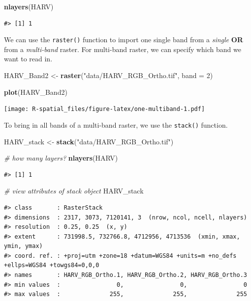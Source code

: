 \documentclass[]{book}
\newenvironment{Shaded}{\begin{snugshade}}{\end{snugshade}}
\newcommand{\KeywordTok}[1]{\textcolor[rgb]{0.13,0.29,0.53}{\textbf{#1}}}
\newcommand{\DataTypeTok}[1]{\textcolor[rgb]{0.13,0.29,0.53}{#1}}
\newcommand{\DecValTok}[1]{\textcolor[rgb]{0.00,0.00,0.81}{#1}}
\newcommand{\StringTok}[1]{\textcolor[rgb]{0.31,0.60,0.02}{#1}}
\newcommand{\CommentTok}[1]{\textcolor[rgb]{0.56,0.35,0.01}{\textit{#1}}}
\newcommand{\NormalTok}[1]{#1}
\theoremstyle{definition}
\theoremstyle{definition}
\theoremstyle{definition}
\theoremstyle{remark}
\begin{document}
\begin{Shaded}
\begin{Highlighting}[]
\KeywordTok{nlayers}\NormalTok{(HARV)}
\end{Highlighting}
\end{Shaded}

\begin{verbatim}
#> [1] 1
\end{verbatim}

We can use the \texttt{raster()} function to import one single band from
a \emph{single} \textbf{OR} from a \emph{multi-band} raster. For
multi-band raster, we can specify which band we want to read in.

\begin{Shaded}
\begin{Highlighting}[]
\NormalTok{HARV_Band2 <-}
\StringTok{  }\KeywordTok{raster}\NormalTok{(}\StringTok{"data/HARV_RGB_Ortho.tif"}\NormalTok{, }\DataTypeTok{band =} \DecValTok{2}\NormalTok{)}

\KeywordTok{plot}\NormalTok{(HARV_Band2)}
\end{Highlighting}
\end{Shaded}

\texttt{[image: R-spatial\_files/figure-latex/one-multiband-1.pdf]}

To bring in all bands of a multi-band raster, we use the
\texttt{stack()} function.

\begin{Shaded}
\begin{Highlighting}[]
\NormalTok{HARV_stack <-}
\StringTok{  }\KeywordTok{stack}\NormalTok{(}\StringTok{"data/HARV_RGB_Ortho.tif"}\NormalTok{)}

\CommentTok{# how many layers?}
\KeywordTok{nlayers}\NormalTok{(HARV)}
\end{Highlighting}
\end{Shaded}

\begin{verbatim}
#> [1] 1
\end{verbatim}

\begin{Shaded}
\begin{Highlighting}[]
\CommentTok{# view attributes of stack object}
\NormalTok{HARV_stack}
\end{Highlighting}
\end{Shaded}

\begin{verbatim}
#> class       : RasterStack 
#> dimensions  : 2317, 3073, 7120141, 3  (nrow, ncol, ncell, nlayers)
#> resolution  : 0.25, 0.25  (x, y)
#> extent      : 731998.5, 732766.8, 4712956, 4713536  (xmin, xmax, ymin, ymax)
#> coord. ref. : +proj=utm +zone=18 +datum=WGS84 +units=m +no_defs +ellps=WGS84 +towgs84=0,0,0 
#> names       : HARV_RGB_Ortho.1, HARV_RGB_Ortho.2, HARV_RGB_Ortho.3 
#> min values  :                0,                0,                0 
#> max values  :              255,              255,              255
\end{verbatim}
\end{document}
